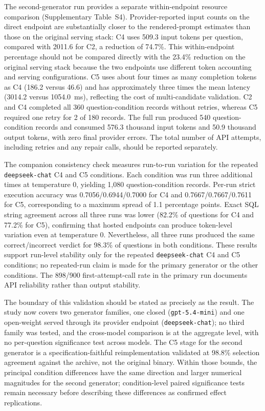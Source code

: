 \documentclass[cmc,article,submit,moreauthors,pdftex]{Definitions/tsp}
\begin{document}
The second-generator run provides a separate within-endpoint resource comparison (Supplementary Table~S4). Provider-reported input counts on the direct endpoint are substantially closer to the rendered-prompt estimates than those on the original serving stack: C4 uses 509.3 input tokens per question, compared with 2011.6 for C2, a reduction of 74.7\%. This within-endpoint percentage should not be compared directly with the 23.4\% reduction on the original serving stack because the two endpoints use different token accounting and serving configurations. C5 uses about four times as many completion tokens as C4 (186.2 versus 46.6) and has approximately three times the mean latency (3014.2 versus 1054.0~ms), reflecting the cost of multi-candidate validation. C2 and C4 completed all 360 question-condition records without retries, whereas C5 required one retry for 2 of 180 records. The full run produced 540 question-condition records and consumed 576.3 thousand input tokens and 50.9 thousand output tokens, with zero final provider errors. The total number of API attempts, including retries and any repair calls, should be reported separately.

The companion consistency check measures run-to-run variation for the repeated \texttt{deepseek-chat} C4 and C5 conditions. Each condition was run three additional times at temperature 0, yielding 1,080 question-condition records. Per-run strict execution accuracy was 0.7056/0.6944/0.7000 for C4 and 0.7667/0.7667/0.7611 for C5, corresponding to a maximum spread of 1.1 percentage points. Exact SQL string agreement across all three runs was lower (82.2\% of questions for C4 and 77.2\% for C5), confirming that hosted endpoints can produce token-level variation even at temperature 0. Nevertheless, all three runs produced the same correct/incorrect verdict for 98.3\% of questions in both conditions. These results support run-level stability only for the repeated \texttt{deepseek-chat} C4 and C5 conditions; no repeated-run claim is made for the primary generator or the other conditions. The 898/900 first-attempt-call rate in the primary run documents API reliability rather than output stability.

The boundary of this validation should be stated as precisely as the result. The study now covers two generator families, one closed (\texttt{gpt-5.4-mini}) and one open-weight served through its provider endpoint (\texttt{deepseek-chat}); no third family was tested, and the cross-model comparison is at the aggregate level, with no per-question significance test across models. The C5 stage for the second generator is a specification-faithful reimplementation validated at 98.8\% selection agreement against the archive, not the original binary. Within those bounds, the principal condition differences have the same direction and larger numerical magnitudes for the second generator; condition-level paired significance tests remain necessary before describing these differences as confirmed effect replications.
\end{document}
